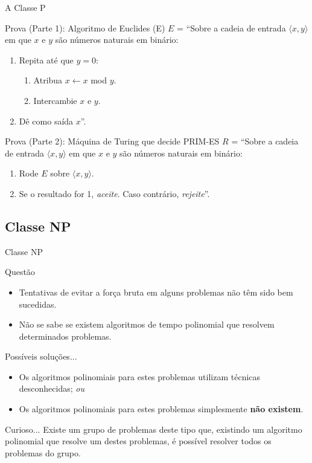 \documentclass[xcolor=dvipsnames,table]{beamer}
\begin{document}
	\begin{frame}{A Classe P}
		\begin{block}{Prova (Parte 1): Algoritmo de Euclides (E)}
			$E$ = ``Sobre a cadeia de entrada $\langle x, y \rangle$ em que $x$ e $y$ são números naturais em binário:
			\begin{enumerate}
				\item Repita até que $y = 0$:
					\begin{enumerate}
						\item Atribua $x \leftarrow x$ mod $y$.
						\item Intercambie $x$ e $y$.
					\end{enumerate}
				\item Dê como saída $x$''.
			\end{enumerate}
		\end{block} 
		\begin{block}{Prova (Parte 2): Máquina de Turing que decide PRIM-ES}
			$R$ = ``Sobre a cadeia de entrada $\langle x, y \rangle$ em que $x$ e $y$ são números naturais em binário:
			\begin{enumerate}
				\item Rode $E$ sobre $\langle x, y \rangle$.
				\item Se o resultado for 1, {\it aceite}. Caso contrário, {\it rejeite}''.
			\end{enumerate}
		\end{block}
	\end{frame}
	
	\subsection{Classe NP}		
	\begin{frame}[shrink]{Classe NP}
		\begin{block}{Questão}
			\begin{itemize}
				\item Tentativas de evitar a força bruta em alguns problemas não têm sido bem sucedidas. 
				\item Não se sabe se existem algoritmos de tempo polinomial que resolvem determinados problemas.
			\end{itemize}
		\end{block} 
		\begin{block}{Possíveis soluções...}
			\begin{itemize}
				\item Os algoritmos polinomiais para estes problemas utilizam técnicas desconhecidas; {\it ou} 
				\item Os algoritmos polinomiais para estes problemas simplesmente {\bf não existem}.
			\end{itemize}
		\end{block} 
		\begin{exampleblock}{Curioso...}
			Existe um grupo de problemas deste tipo que, existindo um algoritmo polinomial que resolve um destes problemas, é possível resolver todos os problemas do grupo.
		\end{exampleblock}
	\end{frame}	
	
\end{document}

